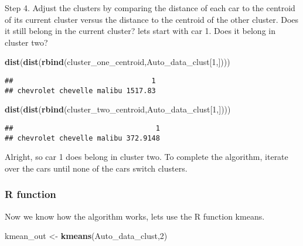 \documentclass[11pt,]{article}
\newenvironment{Shaded}{\begin{snugshade}}{\end{snugshade}}
\newcommand{\DecValTok}[1]{\textcolor[rgb]{0.00,0.00,0.81}{#1}}
\newcommand{\KeywordTok}[1]{\textcolor[rgb]{0.13,0.29,0.53}{\textbf{#1}}}
\newcommand{\NormalTok}[1]{#1}
\newcommand{\StringTok}[1]{\textcolor[rgb]{0.31,0.60,0.02}{#1}}
\begin{document}
Step 4. Adjust the clusters by comparing the distance of each car to the
centroid of its current cluster versus the distance to the centroid of
the other cluster. Does it still belong in the current cluster? lets
start with car 1. Does it belong in cluster two?

\begin{Shaded}
\begin{Highlighting}[]
\KeywordTok{dist}\NormalTok{(}\KeywordTok{dist}\NormalTok{(}\KeywordTok{rbind}\NormalTok{(cluster_one_centroid,Auto_data_clust[}\DecValTok{1}\NormalTok{,])))}
\end{Highlighting}
\end{Shaded}

\begin{verbatim}
##                                 1
## chevrolet chevelle malibu 1517.83
\end{verbatim}

\begin{Shaded}
\begin{Highlighting}[]
\KeywordTok{dist}\NormalTok{(}\KeywordTok{dist}\NormalTok{(}\KeywordTok{rbind}\NormalTok{(cluster_two_centroid,Auto_data_clust[}\DecValTok{1}\NormalTok{,])))}
\end{Highlighting}
\end{Shaded}

\begin{verbatim}
##                                  1
## chevrolet chevelle malibu 372.9148
\end{verbatim}

Alright, so car 1 does belong in cluster two. To complete the algorithm,
iterate over the cars until none of the cars switch clusters.

\hypertarget{r-function-1}{%
\subsubsection{R function}\label{r-function-1}}

Now we know how the algorithm works, lets use the R function kmeans.

\begin{Shaded}
\begin{Highlighting}[]
\NormalTok{kmean_out <-}\StringTok{ }\KeywordTok{kmeans}\NormalTok{(Auto_data_clust,}\DecValTok{2}\NormalTok{)}
\end{Highlighting}
\end{Shaded}

\newpage
\end{document}
